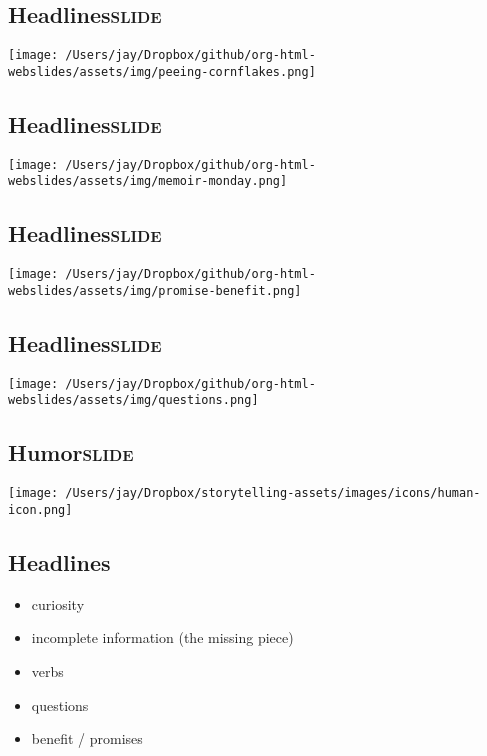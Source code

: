 \documentclass[12pt]{article}
\begin{document}
\subsection[Headlines]{Headlines\hfill{}\textsc{slide}}
\label{sec:orge64e6ab}
\begin{center}
\texttt{[image: /Users/jay/Dropbox/github/org-html-webslides/assets/img/peeing-cornflakes.png]}
\end{center}

\subsection[Headlines]{Headlines\hfill{}\textsc{slide}}
\label{sec:org6e7af1c}
\begin{center}
\texttt{[image: /Users/jay/Dropbox/github/org-html-webslides/assets/img/memoir-monday.png]}
\end{center}


\subsection[Headlines]{Headlines\hfill{}\textsc{slide}}
\label{sec:orgcf5a10c}
\begin{center}
\texttt{[image: /Users/jay/Dropbox/github/org-html-webslides/assets/img/promise-benefit.png]}
\end{center}

\subsection[Headlines]{Headlines\hfill{}\textsc{slide}}
\label{sec:org7770341}
\begin{center}
\texttt{[image: /Users/jay/Dropbox/github/org-html-webslides/assets/img/questions.png]}
\end{center}

\subsection[Humor]{Humor\hfill{}\textsc{slide}}
\label{sec:orgb7e988c}
\begin{center}
\texttt{[image: /Users/jay/Dropbox/storytelling-assets/images/icons/human-icon.png]}
\end{center}


\subsection{Headlines}
\label{sec:orgdac1810}
\begin{itemize}
\item curiosity
\item incomplete information (the missing piece)
\item verbs
\item questions
\item benefit / promises
\end{itemize}
\end{document}
